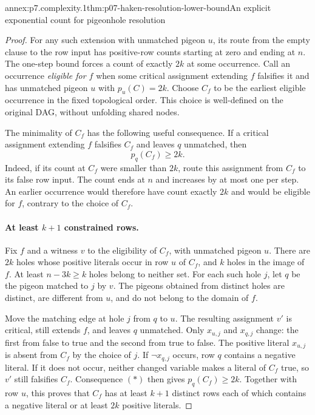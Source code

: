 \begin{annexitem}{annex:p7.complexity.1}{thm:p07-haken-resolution-lower-bound}{An explicit exponential count for pigeonhole resolution}
\begin{proof}
For any such extension with unmatched pigeon \(u\), its route from the
empty clause to the row input has positive-row counts starting at zero
and ending at \(n\). The one-step bound forces a count of exactly \(2k\)
at some occurrence. Call an occurrence \emph{eligible for \(f\)} when
some critical assignment extending \(f\) falsifies it and has unmatched
pigeon \(u\) with \(p_u(C)=2k\). Choose \(C_f\) to be the earliest
eligible occurrence in the fixed topological order. This choice is
well-defined on the original DAG, without unfolding shared nodes.

The minimality of \(C_f\) has the following useful consequence.
If a critical assignment extending \(f\) falsifies \(C_f\) and leaves
\(q\) unmatched, then
\[
 p_q(C_f)\geq2k.                                                \tag{*}
\]
Indeed, if its count at \(C_f\) were smaller than \(2k\), route this
assignment from \(C_f\) to its false row input. The count ends at \(n\)
and increases by at most one per step. An earlier occurrence would
therefore have count exactly \(2k\) and would be eligible for \(f\),
contrary to the choice of \(C_f\).

\paragraph{At least \(k+1\) constrained rows.}
Fix \(f\) and a witness \(v\) to the eligibility of \(C_f\), with unmatched
pigeon \(u\). There are \(2k\) holes whose positive literals occur in
row \(u\) of \(C_f\), and \(k\) holes in the image of \(f\).
At least \(n-3k\geq k\) holes belong to neither set.
For each such hole \(j\), let \(q\) be the pigeon matched to \(j\) by
\(v\). The pigeons obtained from distinct holes are distinct,
are different from \(u\), and do not belong to the domain of \(f\).

Move the matching edge at hole \(j\) from \(q\) to \(u\). The resulting
assignment \(v'\) is critical, still extends \(f\), and leaves \(q\)
unmatched. Only \(x_{u,j}\) and \(x_{q,j}\) change:
the first from false to true and the second from true to false.
The positive literal \(x_{u,j}\) is absent from \(C_f\) by the choice
of \(j\). If \(\neg x_{q,j}\) occurs, row \(q\) contains a negative
literal. If it does not occur, neither changed variable makes a
literal of \(C_f\) true, so \(v'\) still falsifies \(C_f\).
Consequence \((*)\) then gives \(p_q(C_f)\geq2k\).
Together with row \(u\), this proves that \(C_f\) has at least \(k+1\)
distinct rows each of which contains a negative literal or at least
\(2k\) positive literals.


\end{proof}
\end{annexitem}

